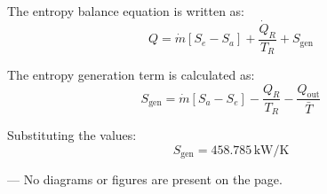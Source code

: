 The entropy balance equation is written as:  
\[
Q = \dot{m} \left[ S_e - S_a \right] + \frac{\dot{Q}_R}{T_R} + S_{\text{gen}}
\]  

The entropy generation term is calculated as:  
\[
S_{\text{gen}} = \dot{m} \left[ S_a - S_e \right] - \frac{Q_R}{T_R} - \frac{Q_{\text{out}}}{\bar{T}}
\]  

Substituting the values:  
\[
S_{\text{gen}} = 458.785 \, \text{kW/K}
\]  

---  
No diagrams or figures are present on the page.